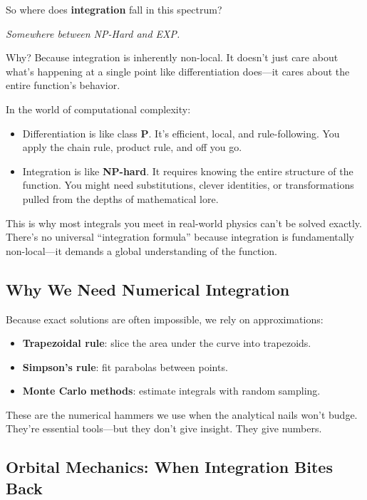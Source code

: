 So where does \textbf{integration} fall in this spectrum?

\textit{Somewhere between NP-Hard and EXP.}

Why? Because integration is inherently non-local. It doesn’t just care about what’s happening at a single point like differentiation does—it cares about the entire function’s behavior.


In the world of computational complexity:

\begin{itemize}
  \item Differentiation is like class \textbf{P}. It’s efficient, local, and rule-following. You apply the chain rule, product rule, and off you go.
  \item Integration is like \textbf{NP-hard}. It requires knowing the entire structure of the function. You might need substitutions, clever identities, or transformations pulled from the depths of mathematical lore.
\end{itemize}

This is why most integrals you meet in real-world physics can’t be solved exactly. There’s no universal “integration formula” because integration is fundamentally non-local—it demands a global understanding of the function.

\subsection{Why We Need Numerical Integration}

Because exact solutions are often impossible, we rely on approximations:

\begin{itemize}
  \item \textbf{Trapezoidal rule}: slice the area under the curve into trapezoids.
  \item \textbf{Simpson’s rule}: fit parabolas between points.
  \item \textbf{Monte Carlo methods}: estimate integrals with random sampling.
\end{itemize}

These are the numerical hammers we use when the analytical nails won’t budge. They’re essential tools—but they don’t give insight. They give numbers.

\subsection{Orbital Mechanics: When Integration Bites Back}

